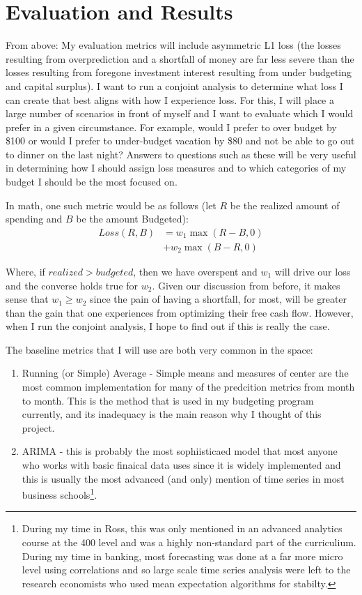 \documentclass[11pt,a4paper]{article}
\begin{document}
\section{Evaluation and Results}

From above: My evaluation metrics will include asymmetric L1 loss (the losses resulting from overprediction and a shortfall of money are far less severe than the losses resulting from foregone investment interest resulting from under budgeting and capital surplus). I want to run a conjoint analysis to determine what loss I can create that best aligns with how I experience loss. For this, I will place a large number of scenarios in front of myself and I want to evaluate which I would prefer in a given circumstance. For example, would I prefer to over budget by \$100 or would I prefer to under-budget vacation by \$80 and not be able to go out to dinner on the last night? Answers to questions such as these will be very useful in determining how I should assign loss measures and to which categories of my budget I should be the most focused on. 

In math, one such metric would be as follows (let $R$ be the realized amount of spending and $B$ be the amount Budgeted):
\begin{align}
Loss(R, B) &= w_1 \max(R - B, 0) \nonumber \\
&+ w_2 \max(B - R, 0)
\end{align}

Where, if $realized > budgeted$, then we have overspent and $w_1$ will drive our loss and the converse holds true for $w_2$. Given our discussion from before, it makes sense that $w_1 \geq w_2$ since the pain of having a shortfall, for most, will be greater than the gain that one experiences from optimizing their free cash flow. However, when I run the conjoint analysis, I hope to find out if this is really the case. 

The baseline metrics that I will use are both very common in the space:
\begin{enumerate}
	\item Running (or Simple) Average - Simple means and measures of center are the most common implementation for many of the predcition metrics from month to month. This is the method that is used in my budgeting program currently, and its inadequacy is the main reason why I thought of this project. 
	\item ARIMA - this is probably the most sophiisticaed model that most anyone who works with basic finaical data uses since it is widely implemented and this is usually the most advanced (and only) mention of time series in most business schools\footnote{During my time in Ross, this was only mentioned in an advanced analytics course at the 400 level and was a highly non-standard part of the curriculium. During my time in banking, most forecasting was done at a far more micro level using correlations and so large scale time series analysis were left to the research economists who used mean expectation algorithms for stabilty.}. 
\end{enumerate}
\end{document}
